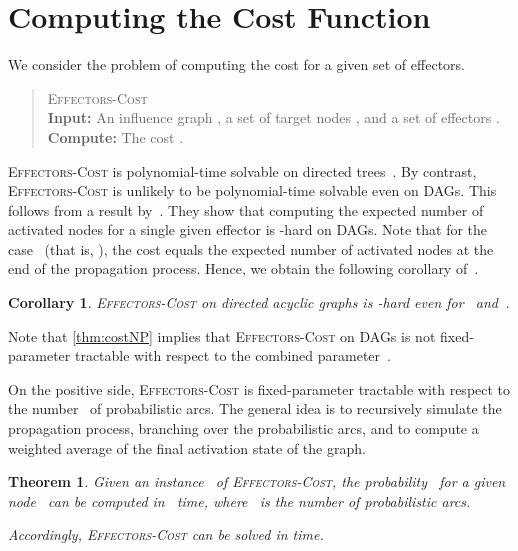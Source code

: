 \documentclass{article}
\newtheorem{theorem}{Theorem}
\newtheorem{corollary}{Corollary}
\newcommand{\probSharpDef}[3]{
  \begin{quote}
    #1 \\
    \textbf{Input:} #2 \\
    \textbf{Compute:} #3
  \end{quote}
}
\newcommand{\probCost}{\textsc{Effectors-Cost}\xspace}
\begin{document}
\section{Computing the Cost Function}\label{section:computingCost}
We consider the problem of computing the cost for a given set of effectors.
\probSharpDef
  {\probCost}
  {An influence graph , a set of target nodes
    , and a set of effectors .}
  {The cost .}

\probCost is polynomial-time solvable on directed trees~\cite{LTGMH10}.
By contrast, 
\probCost is unlikely to be polynomial-time solvable even on DAGs.
This follows from a result by~\citet[Theorem 1]{wang2012scalable}.
They show that computing the expected number of activated nodes for a
single given effector is -hard on DAGs.
Note that for the case~ (that is, ), the cost equals the expected
number of activated nodes at the end of the propagation process.
Hence, we obtain the following corollary of~\citet{wang2012scalable}.

\begin{corollary}\label{thm:costNP}
  \probCost on directed acyclic graphs is -hard even for~ and~.
\end{corollary}

Note that \autoref{thm:costNP} implies that \probCost on DAGs is not fixed-parameter tractable
with respect to the combined parameter~.

On the positive side, \probCost is fixed-parameter tractable with respect to the
number~ of probabilistic arcs.
The general idea is to recursively simulate the propagation process,
branching over the probabilistic arcs,
and to compute a weighted average of the final activation state of the graph.

\begin{theorem}\label{thm:costFPTr}
  Given an instance~ of \probCost, the probability~ for a given node~ can be computed in~ time, where~ is the number of probabilistic arcs.

  Accordingly, \probCost can be solved in  time.
\end{theorem}
\end{document}
